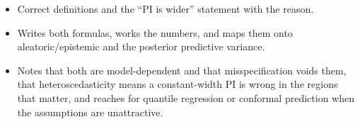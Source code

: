 \begin{interviewq}

\goodgreat
\begin{itemize}
    \item {} Correct definitions and the ``PI is wider'' statement with the reason.
    \item {} Writes both formulas, works the numbers, and maps them onto aleatoric/epistemic and the posterior predictive variance.
    \item {} Notes that both are model-dependent and that misspecification voids them, that heteroscedasticity means a constant-width PI is wrong in the regions that matter, and reaches for quantile regression or conformal prediction when the assumptions are unattractive.
\end{itemize}

\end{interviewq}

